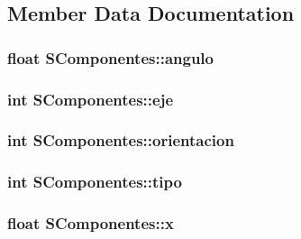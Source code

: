 \subsection{Member Data Documentation}
\hypertarget{struct_s_componentes_a819f738b83b9b0dd910ee9467eb23453}{
\subsubsection[{angulo}]{\setlength{\rightskip}{0pt plus 5cm}float S\-Componentes\-::angulo}}\label{struct_s_componentes_a819f738b83b9b0dd910ee9467eb23453}
\hypertarget{struct_s_componentes_a9c07e6918575bb81aa6ffb9facca753f}{
\subsubsection[{eje}]{\setlength{\rightskip}{0pt plus 5cm}int S\-Componentes\-::eje}}\label{struct_s_componentes_a9c07e6918575bb81aa6ffb9facca753f}
\hypertarget{struct_s_componentes_ab0b787af546cfe4426367c9dc51cad02}{
\subsubsection[{orientacion}]{\setlength{\rightskip}{0pt plus 5cm}int S\-Componentes\-::orientacion}}\label{struct_s_componentes_ab0b787af546cfe4426367c9dc51cad02}
\hypertarget{struct_s_componentes_aae650557a98ffa5aa86364ccbe86782b}{
\subsubsection[{tipo}]{\setlength{\rightskip}{0pt plus 5cm}int S\-Componentes\-::tipo}}\label{struct_s_componentes_aae650557a98ffa5aa86364ccbe86782b}
\hypertarget{struct_s_componentes_a167de81f87ee6114396f6532f8c20da5}{
\subsubsection[{x}]{\setlength{\rightskip}{0pt plus 5cm}float S\-Componentes\-::x}}\label{struct_s_componentes_a167de81f87ee6114396f6532f8c20da5}
